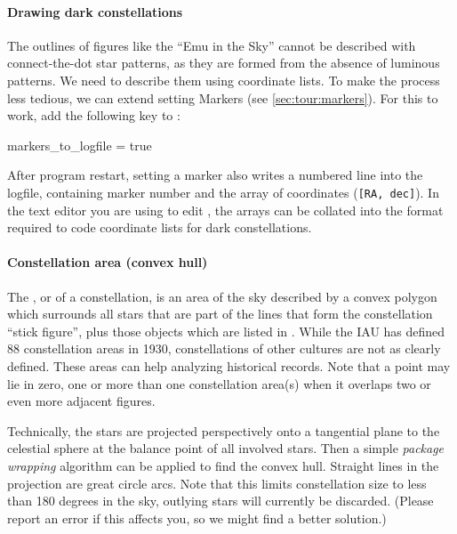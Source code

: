 \paragraph{Drawing dark constellations}\label{SC:constellations:dark:markers}
The outlines of figures like the ``Emu in the Sky'' cannot be described with connect-the-dot star patterns, 
as they are formed from the absence of luminous patterns. We need to describe them using coordinate lists. 
To make the process less tedious, we can extend setting Markers (see \ref{sec:tour:markers}). 
For this to work, add the following key to :
\begin{configfile}
[devel]
markers_to_logfile = true
\end{configfile}
After program restart, setting a marker also writes a numbered line into the logfile, 
containing marker number and the array of coordinates (\texttt{[RA, dec]}). 
In the text editor you are using to edit , 
the arrays can be collated into the format required to code coordinate lists for dark constellations.

\paragraph{Constellation area (convex hull)}
\label{SC:constellation_area}
The , or  of a constellation, 
is an area of the sky described by a convex polygon which surrounds all stars that are part of the lines that form the constellation ``stick figure'', 
plus those objects which are listed in . 
While the IAU has defined 88 constellation areas in 1930, constellations of other cultures are not as clearly defined. These areas can help analyzing historical records.
Note that a point may lie in zero, one or more than one constellation area(s) when it overlaps two or even more adjacent figures. 

Technically, the stars are projected perspectively onto a tangential plane to the celestial sphere 
at the balance point of all involved stars. 
Then a simple \emph{package wrapping} algorithm \citep[ch.25]{Sedgewick:AlgorithmsInC} can be applied to find the convex hull. 
Straight lines in the projection are great circle arcs. 
Note that this limits constellation size to less than 180 degrees in the sky, 
outlying stars will currently be discarded. 
(Please report an error if this affects you, so we might find a better solution.)

